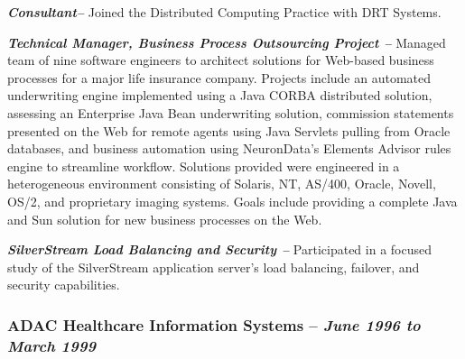 \documentclass[10pt]{report}
\begin{document}
	\begin{description}

    \item{\bf{\emph{Consultant--}}} Joined the Distributed Computing Practice
    with DRT Systems.

    \item{\bf{\emph{Technical Manager, Business Process Outsourcing Project
    --}}}  Managed team of nine software engineers to architect solutions for
    Web-based business processes for a major life insurance company.  Projects
    include an automated underwriting engine implemented using a Java CORBA
    distributed solution, assessing an Enterprise Java Bean underwriting
    solution, commission statements presented on the Web for remote agents using
    Java Servlets pulling from Oracle databases, and business automation using
    NeuronData's Elements Advisor rules engine to streamline workflow. Solutions
    provided were engineered in a heterogeneous environment consisting of
    Solaris, NT, AS/400, Oracle, Novell, OS/2, and proprietary imaging systems.
    Goals include providing a complete Java and Sun solution for new business
    processes on the Web.

    \item{\bf{\emph{SilverStream Load Balancing and Security --}}} Participated
    in a focused  study of the SilverStream application server's load balancing,
    failover,  and security capabilities.

  \end{description}

  \subsubsection*{ADAC Healthcare Information Systems -- \emph{June 1996 to
  March 1999}}
\end{document}
